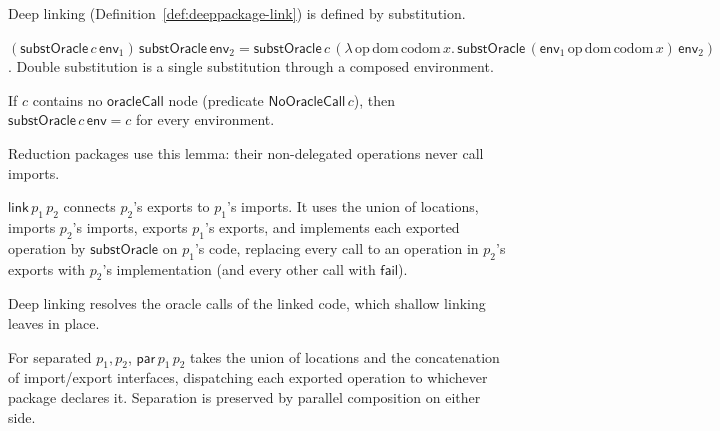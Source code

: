 Deep linking (Definition~\ref{def:deeppackage-link}) is defined by substitution.

\begin{lemma}
  \label{lem:substoracle-comp}
  \leanok
  $(\mathsf{substOracle}\,c\,\mathsf{env}_1)\,\mathsf{substOracle}\,\mathsf{env}_2
  = \mathsf{substOracle}\,c\,(\lambda\,\mathrm{op}\,\mathrm{dom}\,\mathrm{codom}\,x.\,
  \mathsf{substOracle}\,(\mathsf{env}_1\,\mathrm{op}\,\mathrm{dom}\,\mathrm{codom}\,x)\,
  \mathsf{env}_2)$. Double substitution is a single substitution through a
  composed environment.
\end{lemma}

\begin{lemma}
  \label{lem:substoracle-self}
  \leanok
  If $c$ contains no $\mathsf{oracleCall}$ node (predicate $\mathsf{NoOracleCall}\,c$),
  then $\mathsf{substOracle}\,c\,\mathsf{env} = c$ for every environment.
\end{lemma}

Reduction packages use this lemma: their non-delegated operations never call imports.

\begin{definition}
  \label{def:deeppackage-link}
  \leanok
  $\mathsf{link}\,p_1\,p_2$ connects $p_2$'s exports to $p_1$'s imports. It uses
  the union of locations, imports $p_2$'s imports, exports $p_1$'s exports, and
  implements each exported operation by $\mathsf{substOracle}$ on $p_1$'s code,
  replacing every call to an operation in $p_2$'s exports with $p_2$'s
  implementation (and every other call with $\mathsf{fail}$).
\end{definition}

Deep linking resolves the oracle calls of the linked code, which shallow linking leaves
in place.

\begin{definition}
  \label{def:deeppackage-par}
  \leanok
  For separated $p_1, p_2$, $\mathsf{par}\,p_1\,p_2$ takes the union of
  locations and the concatenation of import/export interfaces, dispatching each
  exported operation to whichever package declares it. Separation is preserved
  by parallel composition on either side.
\end{definition}

